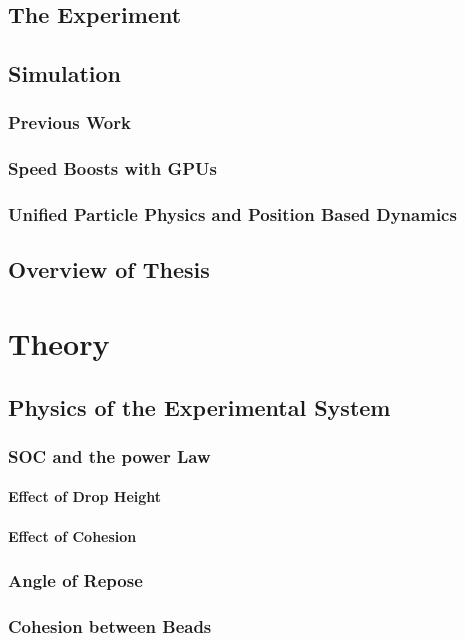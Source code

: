 \documentclass{book}
\begin{document}
\section{The Experiment}

\section{Simulation}
\subsection{Previous Work}
\subsection{Speed Boosts with GPUs}
\subsection{Unified Particle Physics and Position Based Dynamics}


\section{Overview of Thesis}


\chapter{Theory}
\section{Physics of the Experimental System}
\subsection{SOC and the power Law}
\subsubsection{Effect of Drop Height}
\subsubsection{Effect of Cohesion}
\subsection{Angle of Repose}
\subsection{Cohesion between Beads}
\end{document}
